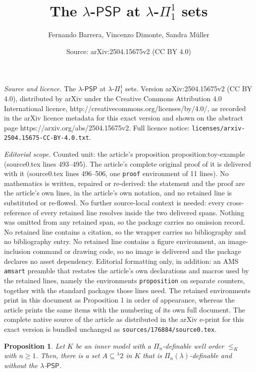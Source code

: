 \documentclass[10pt,a4paper]{amsart}
\title{The $\lambda$-$\mathsf{PSP}$ at $\lambda$-$\Pi^1_1$ sets}
\author{Fernando Barrera, Vincenzo Dimonte, Sandra M\"uller}
\date{Source: arXiv:2504.15675v2 (CC BY 4.0)}
\newtheorem{proposition}{Proposition}
\begin{document}
\maketitle

\noindent\emph{Source and licence.} The $\lambda$-$\mathsf{PSP}$ at $\lambda$-$\Pi^1_1$ sets. Version arXiv:2504.15675v2 (CC BY 4.0), distributed by arXiv under the Creative Commons Attribution 4.0 International licence, http://creativecommons.org/licenses/by/4.0/, as recorded in the arXiv licence metadata for this exact version and shown on the abstract page https://arxiv.org/abs/2504.15675v2. Full licence notice: \texttt{licenses/arxiv-2504.15675-CC-BY-4.0.txt}.\par\smallskip

\noindent\textit{Editorial scope.} Counted unit: the article's proposition proposition:toy-example (source0.tex lines 493--495). The article's complete original proof of it is delivered with it (source0.tex lines 496--506, one \texttt{proof} environment of 11 lines). No mathematics is written, repaired or re-derived: the statement and the proof are the article's own lines, in the article's own notation, and no retained line is substituted or re-flowed.  No further source-local context is needed: every cross-reference of every retained line resolves inside the two delivered spans.  Nothing was omitted from any retained span, so the package carries no omission record.  No retained line contains a citation, so the wrapper carries no bibliography and no bibliography entry.  No retained line contains a figure environment, an image-inclusion command or drawing code, so no image is delivered and the package declares no asset dependency.  Editorial formatting only, in addition: an AMS \texttt{amsart} preamble that restates the article's own declarations and macros used by the retained lines, namely the environments \texttt{proposition} on separate counters, together with the standard packages those lines need.  The retained environments print in this document as Proposition 1 in order of appearance, whereas the article prints the same items with the numbering of its own full document.  The complete native source of the article as distributed in the arXiv e-print for this exact version is bundled unchanged as \texttt{sources/176884/source0.tex}.
\begin{proposition}\label{proposition:toy-example}
	Let $K$ be an inner model with a $\Pi_{n}$-definable well order $\leq_{K}$ with $n\geq1$. Then, there is a set $A\subseteq {}^{\lambda}2$ in $K$ that is $\Pi_n(\lambda)$-definable and without the $\lambda$-$\mathsf{PSP}$.
\end{proposition}
\end{document}
